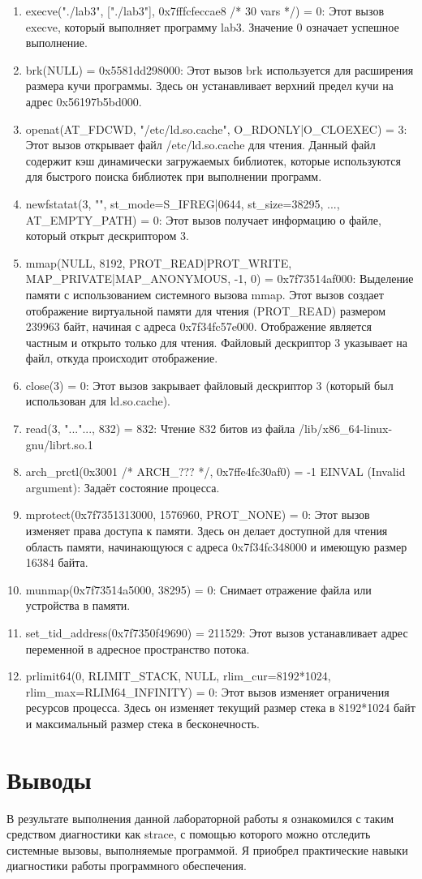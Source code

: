 \documentclass[a4paper, 12pt]{article}
\begin{document}
\begin{enumerate}
    \item execve("./lab3", ["./lab3"], 0x7fffcfeccae8 /* 30 vars */) = 0: Этот вызов execve, который выполняет программу lab3. Значение 0 означает успешное выполнение.
    \item brk(NULL)                               = 0x5581dd298000: Этот вызов brk используется для расширения размера кучи программы. Здесь он устанавливает верхний предел кучи на адрес 0x56197b5bd000.
    \item openat(AT\_FDCWD, "/etc/ld.so.cache", O\_RDONLY|O\_CLOEXEC) = 3: Этот вызов открывает файл /etc/ld.so.cache для чтения. Данный файл содержит кэш динамически загружаемых библиотек, которые используются для быстрого поиска библиотек при выполнении программ.
    \item newfstatat(3, "", {st\_mode=S\_IFREG|0644, st\_size=38295, ...}, AT\_EMPTY\_PATH) = 0:
    Этот вызов получает информацию о файле, который открыт дескриптором 3.
    \item mmap(NULL, 8192, PROT\_READ|PROT\_WRITE, MAP\_PRIVATE|MAP\_ANONYMOUS, -1, 0) = 0x7f73514af000: 
    Выделение памяти с использованием системного вызова mmap. Этот вызов создает отображение виртуальной памяти для чтения (PROT\_READ) размером 239963 байт, начиная с адреса 0x7f34fc57e000. Отображение является частным и открыто только для чтения. Файловый дескриптор 3 указывает на файл, откуда происходит отображение.
    \item close(3) = 0: Этот вызов закрывает файловый дескриптор 3 (который был использован для ld.so.cache).
    \item read(3, "..."..., 832) = 832:
    Чтение 832 битов из файла /lib/x86\_64-linux-gnu/librt.so.1
    \item arch\_prctl(0x3001 /* ARCH\_??? */, 0x7ffe4fc30af0) = -1 EINVAL (Invalid argument): Задаёт состояние процесса.
    \item mprotect(0x7f7351313000, 1576960, PROT\_NONE) = 0: Этот вызов изменяет права доступа к памяти. Здесь он делает доступной для чтения область памяти, начинающуюся с адреса 0x7f34fc348000 и имеющую размер 16384 байта.
    \item munmap(0x7f73514a5000, 38295)           = 0: Снимает отражение файла или устройства в памяти.
    \item set\_tid\_address(0x7f7350f49690)         = 211529: Этот вызов устанавливает адрес переменной в адресное пространство потока.
    \item prlimit64(0, RLIMIT\_STACK, NULL, {rlim\_cur=8192*1024, rlim\_max=RLIM64\_INFINITY}) = 0: Этот вызов изменяет ограничения ресурсов процесса. Здесь он изменяет текущий размер стека в 8192*1024 байт и максимальный размер стека в бесконечность.
\end{enumerate}

\newpage
\section{Выводы}

В результате выполнения данной лабораторной работы я ознакомился с таким средством диагностики как strace, с помощью которого можно отследить системные вызовы, выполняемые программой. Я приобрел практические навыки диагностики работы программного обеспечения.
\end{document}

